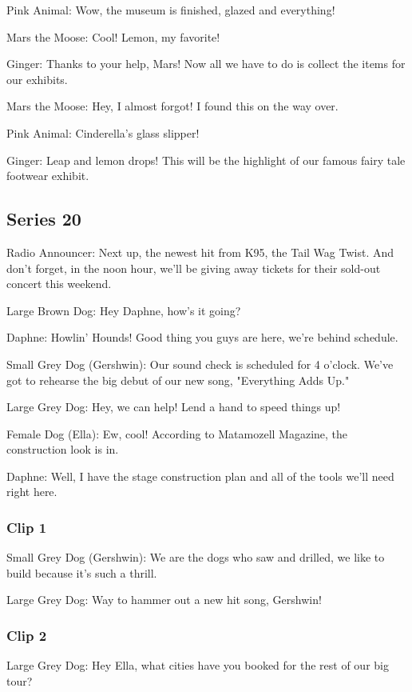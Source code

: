 Pink Animal: Wow, the museum is finished, glazed and everything!

Mars the Moose: Cool! Lemon, my favorite!

Ginger: Thanks to your help, Mars! Now all we have to do is collect the items for our exhibits.

Mars the Moose: Hey, I almost forgot! I found this on the way over.

Pink Animal: Cinderella's glass slipper!

Ginger: Leap and lemon drops! This will be the highlight of our famous fairy tale footwear exhibit.

\subsection{Series 20}

Radio Announcer: Next up, the newest hit from K95, the Tail Wag Twist. And don't forget, in the noon hour, we'll be giving away tickets for their sold-out concert this weekend.

Large Brown Dog: Hey Daphne, how's it going?

Daphne: Howlin' Hounds! Good thing you guys are here, we're behind schedule.

Small Grey Dog (Gershwin): Our sound check is scheduled for 4 o'clock. We've got to rehearse the big debut of our new song, "Everything Adds Up."

Large Grey Dog: Hey, we can help! Lend a hand to speed things up!

Female Dog (Ella): Ew, cool! According to Matamozell Magazine, the construction look is in.

Daphne: Well, I have the stage construction plan and all of the tools we'll need right here.

\subsubsection{Clip 1}

Small Grey Dog (Gershwin): We are the dogs who saw and drilled, we like to build because it's such a thrill.

Large Grey Dog: Way to hammer out a new hit song, Gershwin!

\subsubsection{Clip 2}

Large Grey Dog: Hey Ella, what cities have you booked for the rest of our big tour?

